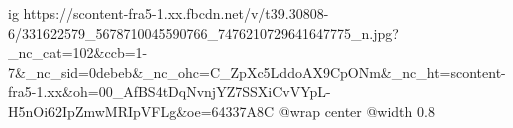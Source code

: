  
 
 
 
 

\ifcmt
  ig https://scontent-fra5-1.xx.fbcdn.net/v/t39.30808-6/331622579_5678710045590766_7476210729641647775_n.jpg?_nc_cat=102&ccb=1-7&_nc_sid=0debeb&_nc_ohc=C_ZpXc5LddoAX9CpONm&_nc_ht=scontent-fra5-1.xx&oh=00_AfBS4tDqNvnjYZ7SSXiCvVYpL-H5nOi62IpZmwMRIpVFLg&oe=64337A8C
  @wrap center
  @width 0.8
\fi
